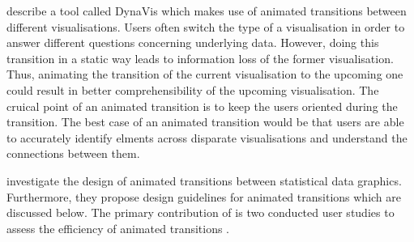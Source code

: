 \cbstart
\citeauthor{Heer2007} describe a tool called DynaVis which makes use of animated transitions between different visualisations. Users often switch the type of a visualisation in order to answer different questions concerning underlying data. However, doing this transition in a static way leads to information loss of the former visualisation. Thus, animating the transition of the current visualisation to the upcoming one could result in better comprehensibility of the upcoming visualisation. The cruical point of an animated transition is to keep the users oriented during the transition. The best case of an animated transition would be that users are able to accurately identify elments across disparate visualisations and understand the connections between them.

\citeauthor{Heer2007} investigate the design of animated transitions between statistical data graphics. Furthermore, they propose design guidelines for animated transitions which are discussed below. The primary contribution of \citeauthor{Heer2007} is two conducted user studies to assess the efficiency of animated transitions .

